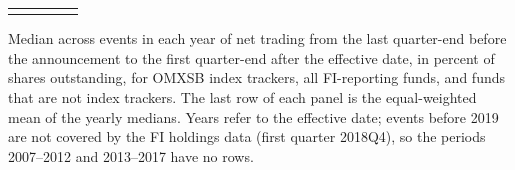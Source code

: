 \begin{threeparttable}
\begin{tabular}{@{}lcccc}
\addlinespace[0.25ex]
\bottomrule
\end{tabular}
\endgroup
\noindent\begin{minipage}{\linewidth}\smallskip\footnotesize
Median across events in each year of net trading from the last quarter-end before the announcement to the first quarter-end after the effective date, in percent of shares outstanding, for OMXSB index trackers, all FI-reporting funds, and funds that are not index trackers. The last row of each panel is the equal-weighted mean of the yearly medians. Years refer to the effective date; events before 2019 are not covered by the FI holdings data (first quarter 2018Q4), so the periods 2007–2012 and 2013–2017 have no rows.\end{minipage}

\end{threeparttable}